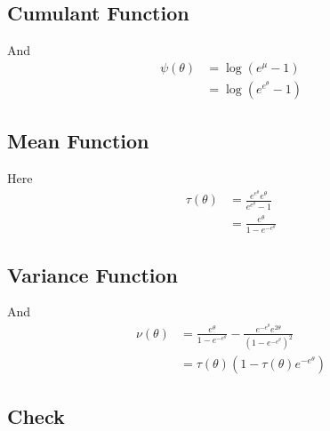 \subsection{Cumulant Function}

And
\begin{align*}
   \psi(\theta)
   & =
   \log \left( e^\mu - 1 \right)
   \\
   & =
   \log \left( e^{e^\theta} - 1 \right)
\end{align*}

\subsection{Mean Function}

Here
\begin{align*}
   \tau(\theta)
   & =
   \frac{e^{e^\theta} e^\theta}{e^{e^\theta} - 1}
   \\
   & =
   \frac{e^\theta}{1 - e^{- e^\theta}}
\end{align*}


\subsection{Variance Function}

And
\begin{align*}
   \nu(\theta)
   & =
   \frac{e^\theta}{1 - e^{- e^\theta}}
   -
   \frac{e^{- e^\theta} e^{2 \theta}}{(1 - e^{- e^\theta})^2}
   \\
   & =
   \tau(\theta) \left(1 - \tau(\theta) e^{- e^\theta} \right)
\end{align*}

\subsection{Check}

